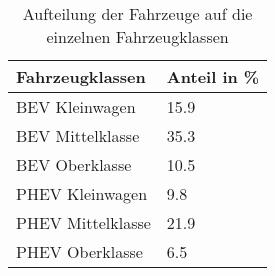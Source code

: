 {
\renewcommand{\arraystretch}{1.2}%
\begin{table}[H]
	\begin{center}
		\caption{Aufteilung der Fahrzeuge auf die einzelnen Fahrzeugklassen}
		\begin{tabu} to 0.6\textwidth {X[1] X[1, r]}
			\toprule
			Fahrzeugklassen   & Anteil in \si{\percent}  \\ \midrule
			BEV Kleinwagen    & \num{15.9}               \\
			BEV Mittelklasse  & \num{35.3}               \\
			BEV Oberklasse    & \num{10.5}               \\
			PHEV Kleinwagen   & \num{9.8}                \\
			PHEV Mittelklasse & \num{21.9}               \\
			PHEV Oberklasse   & \num{6.5}                \\ \bottomrule
		\end{tabu}
		\label{tab:CarSplit}
	\end{center}
	\vspace{-3mm}%
\end{table}
}